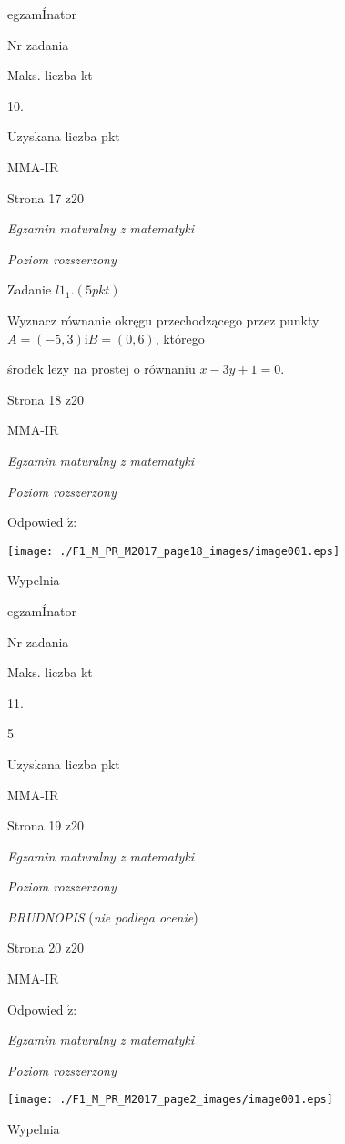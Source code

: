 \documentclass[a4paper,12pt]{article}
\begin{document}
egzamÍnator

Nr zadania

Maks. liczba kt

10.

Uzyskana liczba pkt

MMA-IR

Strona 17 z20





{\it Egzamin maturalny z matematyki}

{\it Poziom rozszerzony}

Zadanie $l1_{1}. (5pkt)$

Wyznacz równanie okręgu przechodzącego przez punkty $A=(-5,3) \mathrm{i} B=(0,6)$, którego

środek lezy na prostej o równaniu $x-3y+1=0.$

Strona 18 z20

MMA-IR





{\it Egzamin maturalny z matematyki}

{\it Poziom rozszerzony}

Odpowied $\acute{\mathrm{z}}$:
\begin{center}
\texttt{[image: ./F1\_M\_PR\_M2017\_page18\_images/image001.eps]}
\end{center}
Wypelnia

egzamÍnator

Nr zadania

Maks. liczba kt

11.

5

Uzyskana liczba pkt

MMA-IR

Strona 19 z20





{\it Egzamin maturalny z matematyki}

{\it Poziom rozszerzony}

{\it BRUDNOPIS} ({\it nie podlega ocenie})

Strona 20 z20

MMA-IR





Odpowied $\acute{\mathrm{z}}$:

{\it Egzamin maturalny z matematyki}

{\it Poziom rozszerzony}
\begin{center}
\texttt{[image: ./F1\_M\_PR\_M2017\_page2\_images/image001.eps]}
\end{center}
Wypelnia
\end{document}
